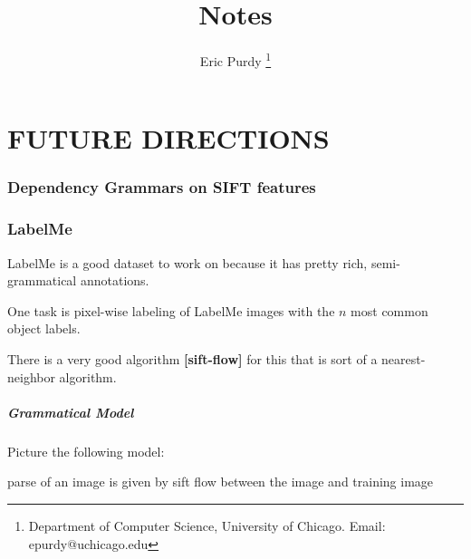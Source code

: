\documentclass{article}
\title{Notes}
\author{Eric Purdy \footnote{Department of Computer Science,
    University of Chicago. Email: epurdy@uchicago.edu}}
\newcommand\fakecite[1]{ {\bf [#1]} }
\begin{document}
\maketitle

\tableofcontents
\part{FUTURE DIRECTIONS}

\section{Dependency Grammars on SIFT features}


\section{LabelMe}

LabelMe is a good dataset to work on because it has pretty rich,
semi-grammatical annotations.

One task is pixel-wise labeling of LabelMe images with the $n$ most
common object labels.

There is a very good algorithm \fakecite{sift-flow} for this that is
sort of a nearest-neighbor algorithm.

\subsubsection{Grammatical Model}

Picture the following model:
\bitem


\item parse of an image is given by sift flow between the image and training image

\eitem
\end{document}
